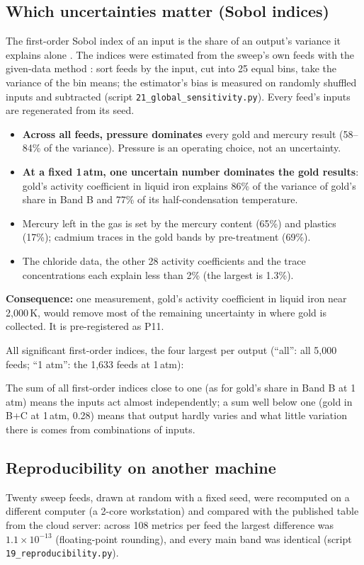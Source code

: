 \documentclass[11pt,a4paper]{article}
\begin{document}
\subsection{Which uncertainties matter (Sobol indices)}
The first-order Sobol index of an input is the share of an output's variance it explains alone \citep{sobol2001,saltelli2008}. The indices were estimated from the sweep's own feeds with the given-data method \citep{plischke2013}: sort feeds by the input, cut into 25 equal bins, take the variance of the bin means; the estimator's bias is measured on randomly shuffled inputs and subtracted (script \texttt{21\_global\_sensitivity.py}). Every feed's inputs are regenerated from its seed.
\begin{itemize}
\item \textbf{Across all feeds, pressure dominates} every gold and mercury result (58--84\% of the variance). Pressure is an operating choice, not an uncertainty.
\item \textbf{At a fixed 1\,atm, one uncertain number dominates the gold results}: gold's activity coefficient in liquid iron explains 86\% of the variance of gold's share in Band B and 77\% of its half-condensation temperature.
\item Mercury left in the gas is set by the mercury content (65\%) and plastics (17\%); cadmium traces in the gold bands by pre-treatment (69\%).
\item The chloride data, the other 28 activity coefficients and the trace concentrations each explain less than 2\% (the largest is 1.3\%).
\end{itemize}
\textbf{Consequence:} one measurement, gold's activity coefficient in liquid iron near 2,000\,K, would remove most of the remaining uncertainty in where gold is collected. It is pre-registered as P11.

\noindent All significant first-order indices, the four largest per output (``all'': all 5,000 feeds; ``1 atm'': the 1,633 feeds at 1\,atm):

The sum of all first-order indices close to one (as for gold's share in Band B at 1\,atm) means the inputs act almost independently; a sum well below one (gold in B+C at 1\,atm, 0.28) means that output hardly varies and what little variation there is comes from combinations of inputs.

\subsection{Reproducibility on another machine}
Twenty sweep feeds, drawn at random with a fixed seed, were recomputed on a different computer (a 2-core workstation) and compared with the published table from the cloud server: across 108 metrics per feed the largest difference was $1.1\times10^{-13}$ (floating-point rounding), and every main band was identical (script \texttt{19\_reproducibility.py}).
\end{document}
